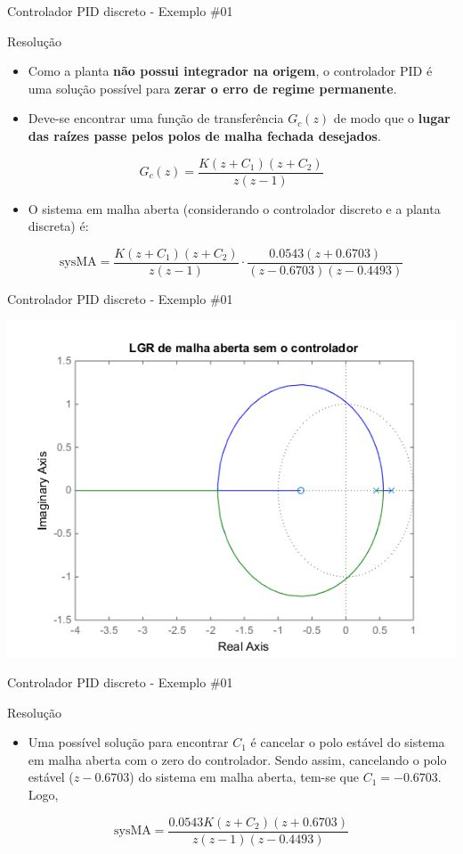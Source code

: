 \begin{frame}{Controlador PID discreto - Exemplo \#01}
\begin{block}{Resolução}
\begin{itemize}
    \item Como a planta \textbf{não possui integrador na origem}, o controlador PID é uma solução possível para \textbf{zerar o erro de regime permanente}.
    \item Deve-se encontrar uma função de transferência $ G_c(z) $ de modo que o \textbf{lugar das raízes passe pelos polos de malha fechada desejados}.
\end{itemize}
	
	\[ G_c(z)=\dfrac{K(z+C_1)(z+C_2)}{z(z-1)} \]
	
\begin{itemize}
    \item O sistema em malha aberta (considerando o controlador discreto e a planta discreta) é:
\end{itemize}

	\[ \text{sysMA}=\dfrac{K(z+C_1)(z+C_2)}{z(z-1)}\cdot\dfrac{\num{0,0543}(z+\num{0,6703})}{(z-\num{0,6703})(z-\num{0,4493})} \]
\end{block}
\end{frame}

\begin{frame}{Controlador PID discreto - Exemplo \#01}
\centerline{\includegraphics[width=0.8\linewidth]{Figuras/Ch12/fig1.png}}
\end{frame}


\begin{frame}{Controlador PID discreto - Exemplo \#01}
\begin{block}{Resolução}
\begin{itemize}
    \item Uma possível solução para encontrar $C_1$ é cancelar o polo estável do sistema em malha aberta com o zero do controlador. Sendo assim, cancelando o polo estável ($ z-\num{0,6703} $) do sistema em malha aberta, tem-se que $ C_1=-\num{0,6703} $. Logo,
\end{itemize}
\[ \text{sysMA}=\dfrac{\num{0,0543}K(z+C_2)(z+\num{0,6703})}{z(z-1)(z-\num{0,4493})} \]
\end{block}
\end{frame}


